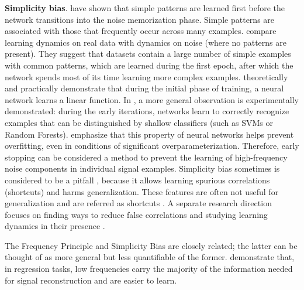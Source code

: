 

\textbf{Simplicity bias}. \cite{arpit2017closer} have shown that simple patterns
are learned first before the network transitions into the noise memorization
phase. Simple patterns are associated with those that frequently occur across
many examples. \cite{arpit2017closer} compare learning dynamics on real data
with dynamics on noise (where no patterns are present). They suggest that
datasets contain a large number of simple examples with common patterns, which
are learned during the first epoch, after which the network spends most of its
time learning more complex examples. \cite{hu2020surprising} theoretically and
practically demonstrate that during the initial phase of training, a neural
network learns a linear function. In \citep{mangalam2019deep}, a more general
observation is experimentally demonstrated: during the early iterations,
networks learn to correctly recognize examples that can be distinguished by
shallow classifiers (such as SVMs or Random Forests). \cite{zhang2021linear}
emphasize that this property of neural networks helps prevent overfitting, even
in conditions of significant overparameterization. Therefore, early stopping can
be considered a method to prevent the learning of high-frequency noise
components in individual signal examples. Simplicity bias sometimes is
considered to be a pitfall \citep{shah2020pitfalls,pezeshki2022dynamics},
because it allows learning spurious correlations (shortcuts) and harms
generalization. These features are often not useful for generalization and are
referred as shortcuts \citep{geirhos2020shortcut, wang2022frequency}. A separate
research direction focuses on finding ways to reduce false correlations and
studying learning dynamics in their presence \citep{pezeshki2022dynamics,
  qiu2024complexity}.


The Frequency Principle and Simplicity Bias are closely related; the latter can
be thought of as more general but less quantifiable of the former. \cite{xu2021deep}
demonstrate that, in regression tasks, low frequencies carry the majority of the
information needed for signal reconstruction and are easier to learn.

